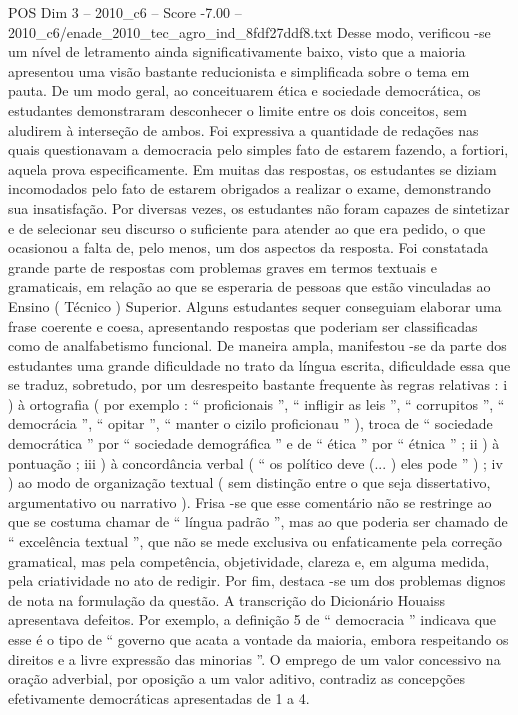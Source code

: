 \begin{textsample}{POS Dim 3 – 2010\_c6 – Score -7.00 – 2010\_c6/enade\_2010\_tec\_agro\_ind\_8fdf27ddf8.txt}
Desse modo, verificou -se um nível de letramento ainda significativamente baixo, visto que a maioria apresentou uma visão bastante reducionista e simplificada sobre o tema em pauta.
De um modo geral, ao conceituarem ética e sociedade democrática, os estudantes demonstraram desconhecer o limite entre os dois conceitos, sem aludirem à interseção de ambos.
Foi expressiva a quantidade de redações nas quais questionavam a democracia pelo simples fato de estarem fazendo, a fortiori, aquela prova especificamente.
Em muitas das respostas, os estudantes se diziam incomodados pelo fato de estarem obrigados a realizar o exame, demonstrando sua insatisfação.
Por diversas vezes, os estudantes não foram capazes de sintetizar e de selecionar seu discurso o suficiente para atender ao que era pedido, o que ocasionou a falta de, pelo menos, um dos aspectos da resposta.
Foi constatada grande parte de respostas com problemas graves em termos textuais e gramaticais, em relação ao que se esperaria de pessoas que estão vinculadas ao Ensino ( Técnico ) Superior.
Alguns estudantes sequer conseguiam elaborar uma frase coerente e coesa, apresentando respostas que poderiam ser classificadas como de analfabetismo funcional.
De maneira ampla, manifestou -se da parte dos estudantes uma grande dificuldade no trato da língua escrita, dificuldade essa que se traduz, sobretudo, por um desrespeito bastante frequente às regras relativas : i ) à ortografia ( por exemplo : “ proficionais ”, “ infligir as leis ”, “ corrupitos ”, “ democrácia ”, “ opitar ”, “ manter o cizilo proficionau ” ), troca de “ sociedade democrática ” por “ sociedade demográfica ” e de “ ética ” por “ étnica ” ; ii ) à pontuação ; iii ) à concordância verbal ( “ os político deve (... ) eles pode ” ) ; iv ) ao modo de organização textual ( sem distinção entre o que seja dissertativo, argumentativo ou narrativo ).
Frisa -se que esse comentário não se restringe ao que se costuma chamar de “ língua padrão ”, mas ao que poderia ser chamado de “ excelência textual ”, que não se mede exclusiva ou enfaticamente pela correção gramatical, mas pela competência, objetividade, clareza e, em alguma medida, pela criatividade no ato de redigir.
Por fim, destaca -se um dos problemas dignos de nota na formulação da questão.
A transcrição do Dicionário Houaiss apresentava defeitos.
Por exemplo, a definição 5 de “ democracia ” indicava que esse é o tipo de “ governo que acata a vontade da maioria, embora respeitando os direitos e a livre expressão das minorias ”.
O emprego de um valor concessivo na oração adverbial, por oposição a um valor aditivo, contradiz as concepções efetivamente democráticas apresentadas de 1 a 4.

\end{textsample}
